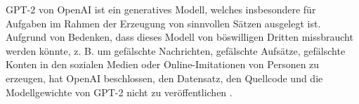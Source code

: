 GPT-2 von OpenAI ist ein generatives Modell, welches insbesondere für Aufgaben im Rahmen der Erzeugung von sinnvollen Sätzen ausgelegt ist. Aufgrund von Bedenken, dass dieses Modell von böswilligen Dritten missbraucht werden könnte, z. B. um gefälschte Nachrichten, gefälschte Aufsätze, gefälschte Konten in den sozialen Medien oder Online-Imitationen von Personen zu erzeugen, hat OpenAI beschlossen, den Datensatz, den Quellcode und die Modellgewichte von GPT-2 nicht zu veröffentlichen \cite{fos19}.